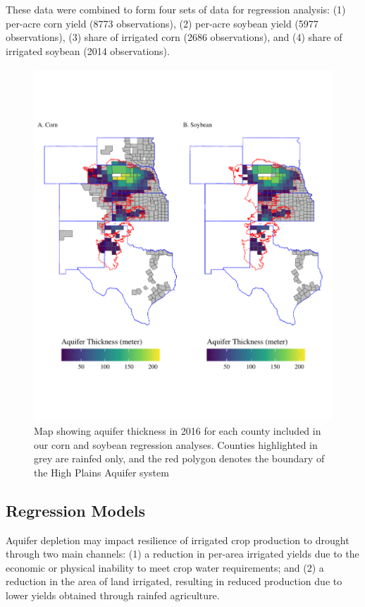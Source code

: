 \documentclass[
]{article}
\begin{document}
These data were combined to form four sets of data for regression analysis: (1) per-acre corn yield (8773 observations), (2) per-acre soybean yield (5977 observations), (3) share of irrigated corn (2686 observations), and (4) share of irrigated soybean (2014 observations).

\begin{figure}[H]

{\centering \includegraphics[width=6in,height=500px,]{Figures/g_map} 

}

\caption{Map showing aquifer thickness in 2016 for each county included in our corn and soybean regression analyses. Counties highlighted in grey are rainfed only, and the red polygon denotes the boundary of the High Plains Aquifer system}\label{fig:sat-map}
\end{figure}

\hypertarget{regression-models}{%
\subsection{Regression Models}\label{regression-models}}

Aquifer depletion may impact resilience of irrigated crop production to drought through two main channels: (1) a reduction in per-area irrigated yields due to the economic or physical inability to meet crop water requirements; and (2) a reduction in the area of land irrigated, resulting in reduced production due to lower yields obtained through rainfed agriculture.
\end{document}
